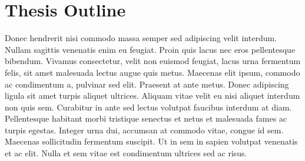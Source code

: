 \section{Thesis Outline}

Donec hendrerit nisi commodo massa semper sed adipiscing velit interdum. Nullam sagittis venenatis enim eu feugiat. Proin quis lacus nec eros pellentesque bibendum. Vivamus consectetur, velit non euismod feugiat, lacus urna fermentum felis, sit amet malesuada lectus augue quis metus. Maecenas elit ipsum, commodo ac condimentum a, pulvinar sed elit. Praesent at ante metus. Donec adipiscing ligula sit amet turpis aliquet ultrices. Aliquam vitae velit eu nisi aliquet interdum non quis sem. Curabitur in ante sed lectus volutpat faucibus interdum at diam. Pellentesque habitant morbi tristique senectus et netus et malesuada fames ac turpis egestas. Integer urna dui, accumsan at commodo vitae, congue id sem. Maecenas sollicitudin fermentum suscipit. Ut in sem in sapien volutpat venenatis et ac elit. Nulla et sem vitae est condimentum ultrices sed ac risus.
